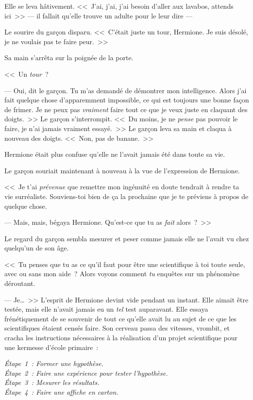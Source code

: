 Elle se leva hâtivement. <<~J'ai, j'ai, j'ai besoin d'aller aux lavabos, attends ici~>> — il fallait qu'elle trouve un adulte pour le leur dire —

Le sourire du garçon disparu. <<~C'était juste un tour, Hermione. Je suis désolé, je ne voulais pas te faire peur.~>>

Sa main s'arrêta sur la poignée de la porte.

<<~Un \emph{tour}~?

--- Oui, dit le garçon. Tu m'as demandé de démontrer mon intelligence. Alors j'ai fait quelque chose d'apparemment impossible, ce qui est toujours une bonne façon de frimer. Je ne peux pas \emph{vraiment} faire tout ce que je veux juste en claquant des doigts.~>> Le garçon s'interrompit. <<~Du moins, je ne \emph{pense} pas pouvoir le faire, je n'ai jamais vraiment essayé.~>> Le garçon leva sa main et claqua à nouveau des doigts. <<~Non, pas de banane.~>>

Hermione était plus confuse qu'elle ne l'avait jamais été dans toute sa vie.

Le garçon souriait maintenant à nouveau à la vue de l'expression de Hermione.

<<~Je t'ai \emph{prévenue} que remettre mon ingénuité en doute tendrait à rendre ta vie surréaliste. Souviens-toi bien de ça la prochaine que je te préviens à propos de quelque chose.

--- Mais, mais, bégaya Hermione. Qu'est-ce que tu as \emph{fait} alors~?~>>

Le regard du garçon sembla mesurer et peser comme jamais elle ne l'avait vu chez quelqu'un de son âge.

<<~Tu penses que tu as ce qu'il faut pour être une scientifique à toi toute seule, avec ou sans mon aide~? Alors voyons comment \emph{tu} enquêtes sur un phénomène déroutant.

--- Je…~>> L'esprit de Hermione devint vide pendant un instant. Elle aimait être testée, mais elle n'avait jamais eu un \emph{tel} test auparavant. Elle essaya frénétiquement de se souvenir de tout ce qu'elle avait lu au sujet de ce que les scientifiques étaient censés faire. Son cerveau passa des vitesses, vrombit, et cracha les instructions nécessaires à la réalisation d'un projet scientifique pour une kermesse d'école primaire~:

\emph{Étape~1~: Former une hypothèse.\\
Étape~2~: Faire une expérience pour tester l'hypothèse.\\
Étape~3~: Mesurer les résultats.\\
Étape~4~: Faire une affiche en carton.}

